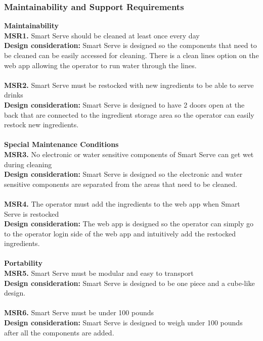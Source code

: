 \documentclass[12pt, titlepage]{article}
\begin{document}
\subsubsection{Maintainability and Support Requirements}
    \textbf{Maintainability}\\
        \noindent\textbf{MSR1.} Smart Serve should be cleaned at least once every day \\
        \indent\textbf{Design consideration:} Smart Serve is designed so the components that need to be cleaned can be easily accessed for cleaning. There is a clean lines option on the web app allowing the operator to run water through the lines.\\\\
        \textbf{MSR2.} Smart Serve must be restocked with new ingredients to be able to serve drinks \\
        \indent\textbf{Design consideration:} Smart Serve is designed to have 2 doors open at the back that are connected to the ingredient storage area so the operator can easily restock new ingredients.\\\\
    \textbf{Special Maintenance Conditions} \\
        \noindent\textbf{MSR3.} No electronic or water sensitive components of Smart Serve can get wet during cleaning \\
        \indent\textbf{Design consideration:} Smart Serve is designed so the electronic and water sensitive components are separated from the areas that need to be cleaned.\\\\
        \textbf{MSR4.} The operator must add the ingredients to the web app when Smart Serve is restocked \\
        \indent\textbf{Design consideration:} The web app is designed so the operator can simply go to the operator login side of the web app and intuitively add the restocked ingredients.\\\\
    \textbf{Portability}\\
        \noindent\textbf{MSR5.} Smart Serve must be modular and easy to transport \\
        \indent\textbf{Design consideration:} Smart Serve is designed to be one piece and a cube-like design.\\\\
        \textbf{MSR6.} Smart Serve must be under 100 pounds \\
        \indent\textbf{Design consideration:} Smart Serve is designed to weigh under 100 pounds after all the components are added.
\end{document}
